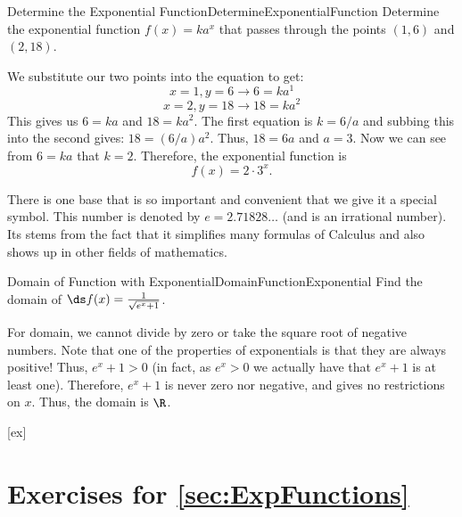 \begin{example}{Determine the Exponential Function}{DetermineExponentialFunction}
Determine the exponential function $f(x)=ka^x$ that passes through the points $(1,6)$ and $(2,18)$.
\end{example}

\begin{solution} 
We substitute our two points into the equation to get:
$$x=1,y=6\to6=ka^1$$
$$x=2,y=18\to18=ka^2$$
This gives us $6=ka$ and $18=ka^2$.
The first equation is $k=6/a$ and subbing this into the second gives: $18=(6/a)a^2$.
Thus, $18=6a$ and $a=3$.
Now we can see from $6=ka$ that $k=2$.
Therefore, the exponential function is $$f(x)=2\cdot 3^x.$$
\end{solution}

There is one base that is so important and convenient that we give it a special symbol.
This number is denoted by $e=2.71828\ldots$ (and is an irrational number). 
Its  stems from the fact that it simplifies many formulas 
of Calculus and also shows up in other fields of mathematics.

\begin{example}{Domain of Function with Exponential}{DomainFunctionExponential}
Find the domain of $\ds f(x)=\frac{1}{\sqrt{e^x+1}}$.
\end{example}

\begin{solution} 
For domain, we cannot divide by zero or take the square root of negative numbers.
Note that one of the properties of exponentials is that they are always positive!
Thus, $e^x+1>0$ (in fact, as $e^x>0$ we actually have that $e^x+1$ is at least one).
Therefore, $e^x+1$ is never zero nor negative, and gives no restrictions on $x$.
Thus, the domain is $\R$.
\end{solution}


[ex]
\section*{Exercises for \ref{sec:ExpFunctions}}

